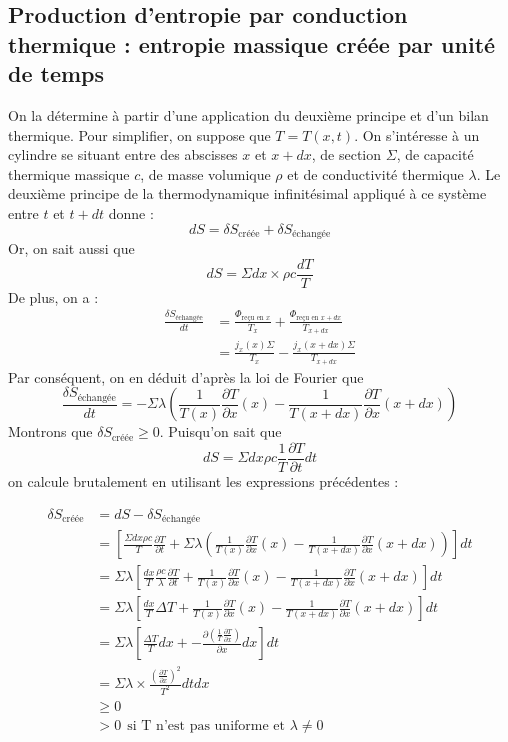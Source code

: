 \documentclass[french]{book}
\theoremstyle{plain}
\theoremstyle{definition}
\theoremstyle{remark}
\begin{document}
\subsection{Production d'entropie par conduction thermique : entropie massique créée par unité de temps}
On la détermine à partir d'une application du deuxième principe et d'un bilan thermique. Pour simplifier, on suppose que $T=T(x,t)$. On s'intéresse à un cylindre se situant entre des abscisses $x$ et $x+dx$, de section $\Sigma$, de capacité thermique massique $c$, de masse volumique $\rho$ et de conductivité thermique $\lambda$. Le deuxième principe de la thermodynamique infinitésimal appliqué à ce système entre $t$ et $t+dt$ donne : $$dS=\delta S_\text{créée}+\delta S_{\text{échangée}}$$ Or, on sait aussi que $$dS=\Sigma dx\times \rho c\frac{dT}{T}$$ De plus, on a :
\begin{align*}
	\frac{\delta S_\text{échangée}}{dt}&=\frac{\Phi_{\text{reçu en }x}}{T_x}+\frac{\Phi_{\text{reçu en }x+dx}}{T_{x+dx}} \\
	&= \frac{j_x(x)\Sigma}{T_x}-\frac{j_x(x+dx)\Sigma}{T_{x+dx}}
\end{align*}
Par conséquent, on en déduit d'après la loi de Fourier que $$\frac{\delta S_\text{échangée}}{dt} =-\Sigma\lambda\left(\frac{1}{T(x)}\frac{\partial T}{\partial x}(x)-\frac{1}{T(x+dx)}\frac{\partial T}{\partial x}(x+dx)\right)$$ Montrons que $\delta S_\text{créée}\geqslant0$. Puisqu'on sait que $$dS=\Sigma dx\rho c\frac{1}{T}\frac{\partial T}{\partial t}dt$$ on calcule brutalement en utilisant les expressions précédentes : \begin{center}
\begin{align*}
	\delta S_\text{créée}&=dS-\delta S_\text{échangée} \\
	&= \left[\frac{\Sigma dx\rho c}{T}\frac{\partial T}{\partial t}+\Sigma\lambda\left(\frac{1}{T(x)}\frac{\partial T}{\partial x}(x)-\frac{1}{T(x+dx)}\frac{\partial T}{\partial x}(x+dx)\right)\right]dt\\
	&= \Sigma \lambda\left[\frac{dx}{T}\frac{\rho c}{\lambda}\frac{\partial T}{\partial t}+\frac{1}{T(x)}\frac{\partial T}{\partial x}(x)-\frac{1}{T(x+dx)}\frac{\partial T}{\partial x}(x+dx)\right]dt \\
	&= \Sigma \lambda\left[\frac{dx}{T}\Delta T+\frac{1}{T(x)}\frac{\partial T}{\partial x}(x)-\frac{1}{T(x+dx)}\frac{\partial T}{\partial x}(x+dx)\right]dt \\
	&= \Sigma \lambda\left[\frac{\Delta T}{T}dx+-\frac{\partial\left(\frac{1}{T}\frac{\partial T}{\partial x}\right)}{\partial x}dx\right]dt \\
	&=\Sigma\lambda \times\frac{\left(\frac{\partial T}{\partial x}\right)^2}{T^2} dtdx \\
	&\geqslant 0 \\
	&>0\ \ \text{si T n'est pas uniforme et }\lambda\ne0
\end{align*}
\end{center}
\end{document}
